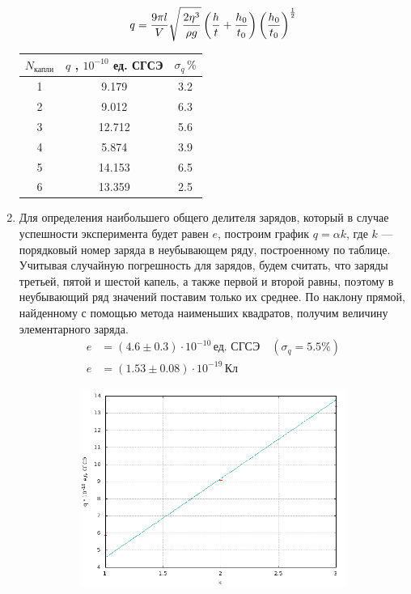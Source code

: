 \documentclass[12pt]{article}
\begin{document}
\begin{enumerate}
		\[
			q = \frac{9 \pi l}{V} \sqrt{\, \frac{2 \eta^3}{\rho g}\mathstrut} \left(\frac{h}{t} + \frac{h_0}{t_0} \right) \left(\frac{h_0}{t_0}\right)^{\frac{1}{2}}
		\]	
		 \begin{table}[h!]
		 	\centering
		 	\begin{tabular}{|c|c|c|}
		 	\hline
		 	$N_\text{капли}$ & $q$ , $10^{-10}$ ед. СГСЭ & $\sigma_q \, \% $ \\
		 	\hline
		 	1 & 9.179 & 3.2\\
		 	2 & 9.012 & 6.3 \\
		 	3 & 12.712 & 5.6\\
		 	4 & 5.874 & 3.9\\
		 	5 & 14.153 & 6.5\\
		 	6 & 13.359 & 2.5\\
		 	\hline
		 	\end{tabular}
		 \end{table}
	\item
		Для определения наибольшего общего делителя зарядов, который в случае успешности эксперимента будет равен $e$, построим график $q = \alpha k$, где $k$ --- порядковый номер заряда в неубывающем ряду, построенному по таблице. Учитывая случайную погрешность для зарядов, будем считать, что заряды третьей, пятой и шестой капель, а также первой и второй равны, поэтому в неубывающий ряд значений поставим только их среднее. По наклону прямой, найденному с помощью метода наименьших квадратов, получим величину элементарного заряда.
   	\begin{align*}
		e &= \left(4.6 \pm 0.3 \right) \cdot 10^{-10} \, \text{ед. СГСЭ} \quad \left(\sigma_q = 5.5 \% \right) \\
		e &= \left(1.53 \pm 0.08 \right)  \cdot 10^{-19} \, \text{Кл} 
	\end{align*}	
	\newpage	
	\begin{figure}[h!]
		\centering
		\includegraphics[width = 12cm, height = 6.5cm]{plot1.png}

\end{figure}
\end{enumerate}
\end{document}

